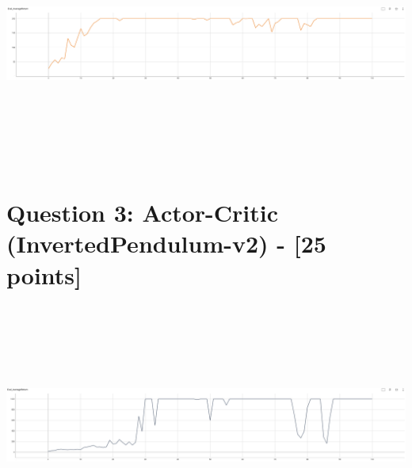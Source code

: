 \documentclass{article}
\begin{document}
\begin{answer}[title=Question 2,height=9.5cm,width=\linewidth]
    \centering
    \includegraphics[height=8cm, width=.99\linewidth]{figs/Q2.png}
\end{answer}

\section{Question 3: Actor-Critic (InvertedPendulum-v2) - [25 points]}

\begin{answer}[title=Question 3,height=9.5cm,width=\linewidth]
    \centering
    \includegraphics[height=8cm, width=.99\linewidth]{figs/Q3.png}
\end{answer}
\end{document}
